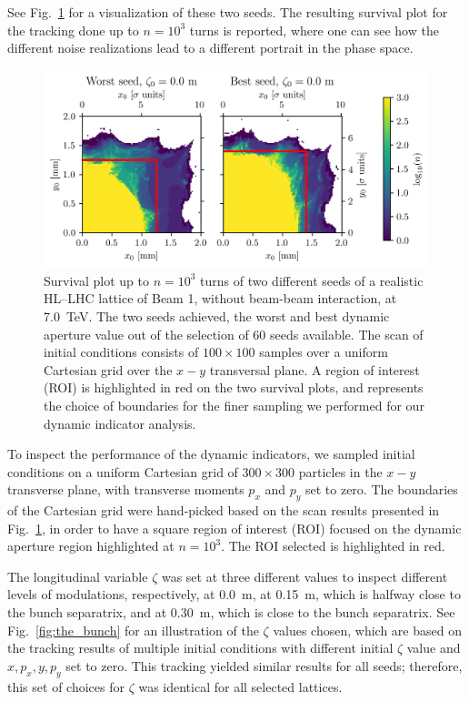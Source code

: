 See Fig.~\ref{fig:seed_presentation} for a visualization of these two seeds. The resulting survival plot for the tracking done up to $n=10^3$ turns is reported, where one can see how the different noise realizations lead to a different portrait in the phase space.

\begin{figure}[htp]
    \centering
    \includegraphics[width=\textwidth]{6_lhc_dynamic_indicators/figs/quick_scan.png}
    \caption{Survival plot up to $n=10^3$ turns of two different seeds of a realistic HL--LHC lattice of Beam 1, without beam-beam interaction, at \SI{7.0}{TeV}. The two seeds achieved, the worst and best dynamic aperture value out of the selection of 60 seeds available. The scan of initial conditions consists of $100\times100$ samples over a uniform Cartesian grid over the $x-y$ transversal plane. A region of interest (ROI) is highlighted in red on the two survival plots, and represents the choice of boundaries for the finer sampling we performed for our dynamic indicator analysis.}
    \label{fig:seed_presentation}
\end{figure}

To inspect the performance of the dynamic indicators, we sampled initial conditions on a uniform Cartesian grid of $300\times300$ particles in the $x-y$ transverse plane, with transverse moments $p_x$ and $p_y$ set to zero. The boundaries of the Cartesian grid were hand-picked based on the scan results presented in Fig.~\ref{fig:seed_presentation}, in order to have a square region of interest (ROI) focused on the dynamic aperture region highlighted at $n=10^3$. The ROI selected is highlighted in red.

The longitudinal variable $\zeta$ was set at three different values to inspect different levels of modulations, respectively, at \SI{0.0}{\meter}, at \SI{0.15}{\meter}, which is halfway close to the bunch separatrix, and at \SI{0.30}{\meter}, which is close to the bunch separatrix. See Fig.~\ref{fig:the_bunch} for an illustration of the $\zeta$ values chosen, which are based on the tracking results of multiple initial conditions with different initial $\zeta$ value and $x, p_x, y, p_y$ set to zero. This tracking yielded similar results for all seeds; therefore, this set of choices for $\zeta$ was identical for all selected lattices.

